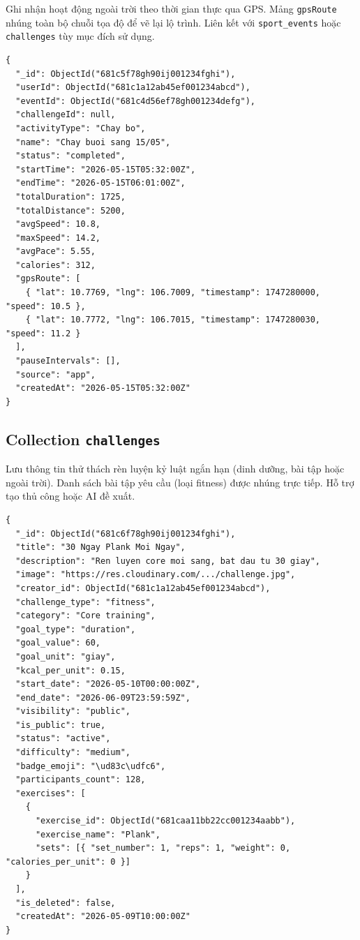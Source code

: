 Ghi nhận hoạt động ngoài trời theo thời gian thực qua GPS. Mảng \texttt{gpsRoute} nhúng toàn bộ chuỗi tọa độ để vẽ lại lộ trình. Liên kết với \texttt{sport\_events} hoặc \texttt{challenges} tùy mục đích sử dụng.

\begin{verbatim}
{
  "_id": ObjectId("681c5f78gh90ij001234fghi"),
  "userId": ObjectId("681c1a12ab45ef001234abcd"),
  "eventId": ObjectId("681c4d56ef78gh001234defg"),
  "challengeId": null,
  "activityType": "Chay bo",
  "name": "Chay buoi sang 15/05",
  "status": "completed",
  "startTime": "2026-05-15T05:32:00Z",
  "endTime": "2026-05-15T06:01:00Z",
  "totalDuration": 1725,
  "totalDistance": 5200,
  "avgSpeed": 10.8,
  "maxSpeed": 14.2,
  "avgPace": 5.55,
  "calories": 312,
  "gpsRoute": [
    { "lat": 10.7769, "lng": 106.7009, "timestamp": 1747280000, "speed": 10.5 },
    { "lat": 10.7772, "lng": 106.7015, "timestamp": 1747280030, "speed": 11.2 }
  ],
  "pauseIntervals": [],
  "source": "app",
  "createdAt": "2026-05-15T05:32:00Z"
}
\end{verbatim}

\subsection{Collection \texttt{challenges}}
\label{subsec:col_challenges}

Lưu thông tin thử thách rèn luyện kỷ luật ngắn hạn (dinh dưỡng, bài tập hoặc ngoài trời). Danh sách bài tập yêu cầu (loại fitness) được nhúng trực tiếp. Hỗ trợ tạo thủ công hoặc AI đề xuất.

\begin{verbatim}
{
  "_id": ObjectId("681c6f78gh90ij001234fghi"),
  "title": "30 Ngay Plank Moi Ngay",
  "description": "Ren luyen core moi sang, bat dau tu 30 giay",
  "image": "https://res.cloudinary.com/.../challenge.jpg",
  "creator_id": ObjectId("681c1a12ab45ef001234abcd"),
  "challenge_type": "fitness",
  "category": "Core training",
  "goal_type": "duration",
  "goal_value": 60,
  "goal_unit": "giay",
  "kcal_per_unit": 0.15,
  "start_date": "2026-05-10T00:00:00Z",
  "end_date": "2026-06-09T23:59:59Z",
  "visibility": "public",
  "is_public": true,
  "status": "active",
  "difficulty": "medium",
  "badge_emoji": "\ud83c\udfc6",
  "participants_count": 128,
  "exercises": [
    {
      "exercise_id": ObjectId("681caa11bb22cc001234aabb"),
      "exercise_name": "Plank",
      "sets": [{ "set_number": 1, "reps": 1, "weight": 0, "calories_per_unit": 0 }]
    }
  ],
  "is_deleted": false,
  "createdAt": "2026-05-09T10:00:00Z"
}
\end{verbatim}

